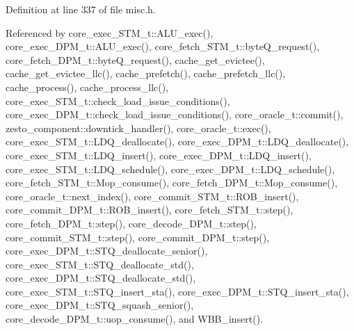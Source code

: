 Definition at line 337 of file misc.h.

Referenced by core\_\-exec\_\-STM\_\-t::ALU\_\-exec(), core\_\-exec\_\-DPM\_\-t::ALU\_\-exec(), core\_\-fetch\_\-STM\_\-t::byteQ\_\-request(), core\_\-fetch\_\-DPM\_\-t::byteQ\_\-request(), cache\_\-get\_\-evictee(), cache\_\-get\_\-evictee\_\-llc(), cache\_\-prefetch(), cache\_\-prefetch\_\-llc(), cache\_\-process(), cache\_\-process\_\-llc(), core\_\-exec\_\-STM\_\-t::check\_\-load\_\-issue\_\-conditions(), core\_\-exec\_\-DPM\_\-t::check\_\-load\_\-issue\_\-conditions(), core\_\-oracle\_\-t::commit(), zesto\_\-component::downtick\_\-handler(), core\_\-oracle\_\-t::exec(), core\_\-exec\_\-STM\_\-t::LDQ\_\-deallocate(), core\_\-exec\_\-DPM\_\-t::LDQ\_\-deallocate(), core\_\-exec\_\-STM\_\-t::LDQ\_\-insert(), core\_\-exec\_\-DPM\_\-t::LDQ\_\-insert(), core\_\-exec\_\-STM\_\-t::LDQ\_\-schedule(), core\_\-exec\_\-DPM\_\-t::LDQ\_\-schedule(), core\_\-fetch\_\-STM\_\-t::Mop\_\-consume(), core\_\-fetch\_\-DPM\_\-t::Mop\_\-consume(), core\_\-oracle\_\-t::next\_\-index(), core\_\-commit\_\-STM\_\-t::ROB\_\-insert(), core\_\-commit\_\-DPM\_\-t::ROB\_\-insert(), core\_\-fetch\_\-STM\_\-t::step(), core\_\-fetch\_\-DPM\_\-t::step(), core\_\-decode\_\-DPM\_\-t::step(), core\_\-commit\_\-STM\_\-t::step(), core\_\-commit\_\-DPM\_\-t::step(), core\_\-exec\_\-DPM\_\-t::STQ\_\-deallocate\_\-senior(), core\_\-exec\_\-STM\_\-t::STQ\_\-deallocate\_\-std(), core\_\-exec\_\-DPM\_\-t::STQ\_\-deallocate\_\-std(), core\_\-exec\_\-STM\_\-t::STQ\_\-insert\_\-sta(), core\_\-exec\_\-DPM\_\-t::STQ\_\-insert\_\-sta(), core\_\-exec\_\-DPM\_\-t::STQ\_\-squash\_\-senior(), core\_\-decode\_\-DPM\_\-t::uop\_\-consume(), and WBB\_\-insert().

